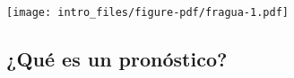 \documentclass[
  letterpaper,
  DIV=11,
  numbers=noendperiod]{scrartcl}
\begin{document}
\texttt{[image: intro\_files/figure-pdf/fragua-1.pdf]}

\subsection{¿Qué es un pronóstico?}\label{quuxe9-es-un-pronuxf3stico}

\subsection{}\label{section-3}

\subsection{}\label{section-4}

\subsection{}\label{section-5}

\subsection{}\label{section-6}
\end{document}
